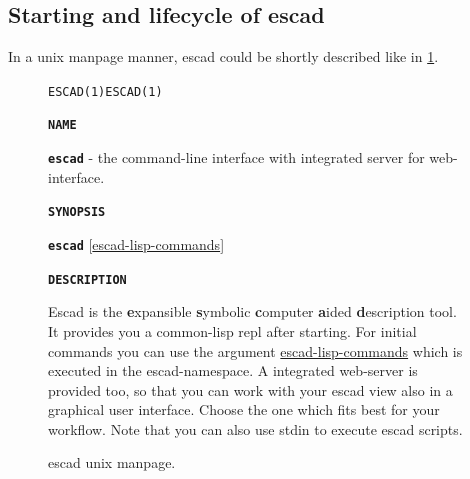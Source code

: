 \documentclass[a4paper, 12pt, openany]{scrbook}
\begin{document}
\subsection{Starting and lifecycle of escad}
In a unix manpage manner, escad could be shortly described like in \ref{fig:manpage}.
\begin{figure}[htbp]
  \begin{shaded*}
    \texttt{ESCAD(1)}\hspace{110mm}\texttt{ESCAD(1)}\newline
    
    \textbf{\texttt{NAME}}\newline
    \hspace*{5mm}
    \begin{minipage}{14cm}
      \textbf{\texttt{escad}} - the command-line interface with integrated server for web-interface.
    \end{minipage}\newline\newline
    
    \textbf{\texttt{SYNOPSIS}}\newline
    \hspace*{5mm}
    \begin{minipage}{14cm}
      \textbf{\texttt{escad}} [\underline{escad-lisp-commands}]
    \end{minipage}\newline\newline
      
    \textbf{\texttt{DESCRIPTION}}\newline
    \hspace*{5mm}
    \begin{minipage}{14cm}
      Escad is the \textbf{e}xpansible \textbf{s}ymbolic \textbf{c}omputer \textbf{a}ided \textbf{d}escription tool. It provides you a common-lisp repl after starting. For initial commands you can use the argument \underline{escad-lisp-commands} which is executed in the escad-namespace. A integrated web-server is provided too, so that you can work with your escad view also in a graphical user interface. Choose the one which fits best for your workflow. Note that you can also use stdin to execute escad scripts.
    \end{minipage}
    \end{shaded*}
  \caption{escad unix manpage.}
  \label{fig:manpage}
\end{figure}
\end{document}
